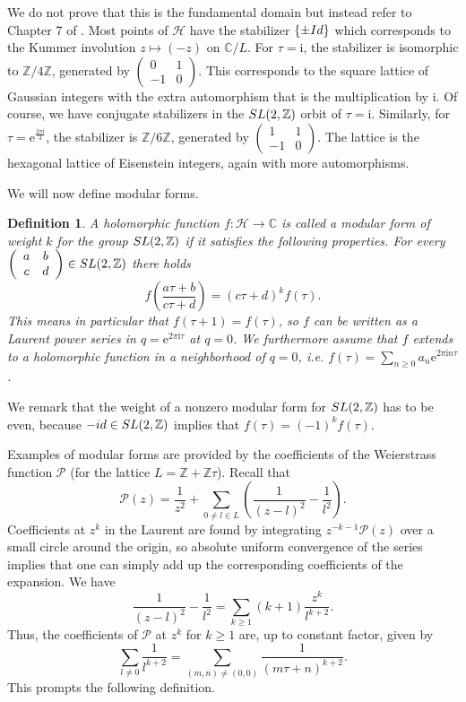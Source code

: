 \documentclass[11pt]{article}
\numberwithin{equation}{section}
\numberwithin{footnote}{section}
\newtheorem{defn}[thm]{Definition}
\newcommand{\ee}{{\mathrm e}}
\newcommand{\ii}{{\mathrm i}}
\newcommand{\Z}{{\mathbb Z}}
\newcommand{\C}{{\mathbb C}}
\begin{document}
\noindent
We do not prove that this is the fundamental domain but instead refer to Chapter 7 of \cite{Serre}. 
Most points of $\mathcal H$
have the stabilizer $\{\pm {\rm Id}\}$ which corresponds to the Kummer involution $z\mapsto (-z)$ on $\C/L$. For $\tau=\ii$, the stabilizer is isomorphic to $\Z/4\Z$, generated by $\left(\begin{array}{cc}0&1\\-1&0\end{array}\right)$. This corresponds to the square lattice of Gaussian integers with the extra automorphism that is the multiplication by $\ii$. Of course, we have conjugate stabilizers in the ${\rm SL}(2,\Z)$ orbit of $\tau=\ii$. Similarly, for $\tau = \ee^{\frac {2\pi\ii}3}$, the stabilizer is $\Z/6\Z$, generated by $\left(\begin{array}{rr}1&1\\-1&0\end{array}\right)$. The lattice is the hexagonal lattice of Eisenstein integers, again with more automorphisms.

\smallskip
We will now define modular forms.

\smallskip
\begin{defn}
A holomorphic function $f:\mathcal H \to \C$ is called a modular form of weight $k$ for the group ${\rm SL}(2,\Z)$ if 
it satisfies the following properties.
For every $\left( \begin{array}{cc}a&b\\c&d\end{array}\right)\in {\rm SL}(2,\Z)$ there holds 
$$
f\left(\frac {a\tau+b}{c\tau+d}\right) = (c\tau+d)^k f(\tau).
$$
This means in particular that $f(\tau+1)=f(\tau)$, so $f$ can be written as a Laurent power series in
$q=\ee^{2\pi\ii\tau}$ at $q=0$. We furthermore assume that $f$ extends to a holomorphic function in
a neighborhood of $q=0$, i.e. $f(\tau) = \sum_{n\geq 0}a_n \ee^{2\pi\ii n\tau}$.
\end{defn}

We remark that the weight of a nonzero modular form for ${\rm SL}(2,\Z)$ has to be even, because $-{\rm id}\in {\rm SL}(2,\Z)$ implies that 
$f(\tau) = (-1)^k f(\tau)$.

\smallskip
Examples of modular forms are provided by the coefficients of the Weierstrass function $\mathcal P$ (for the
lattice $L=\Z+\Z\tau$). Recall that
$$
\mathcal P(z) = \frac 1{z^2} + \sum_{0\neq l \in L} \left(\frac 1{(z-l)^2}-\frac 1{l^2}\right).
$$
Coefficients at $z^k$ in the Laurent are found by integrating $z^{-k-1}\mathcal P(z)$ over a small circle around the origin,
so absolute uniform convergence of the series implies that one can simply add up the corresponding coefficients of the expansion. We have
$$
\frac 1{(z-l)^2}-\frac 1{l^2}= \sum_{k\geq 1} (k+1) \frac {z^k}{l^{k+2}}.
$$
Thus, the coefficients of $\mathcal P$ at $z^k$ for $k\geq 1$ are, up to constant factor, given by
$$
\sum_{l\neq 0} \frac 1{l^{k+2}} = \sum_{(m,n)\neq (0,0)} \frac 1{(m\tau + n)^{k+2}}.
$$
This prompts the following definition.
\end{document}
